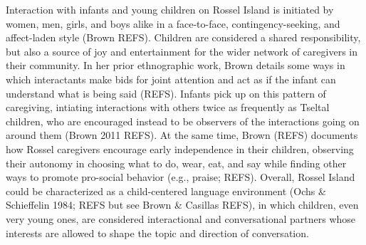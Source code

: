 \documentclass[,man,floatsintext]{apa6}
\begin{document}
Interaction with infants and young children on Rossel Island is
initiated by women, men, girls, and boys alike in a face-to-face,
contingency-seeking, and affect-laden style (Brown REFS). Children are
considered a shared responsibility, but also a source of joy and
entertainment for the wider network of caregivers in their community. In
her prior ethnographic work, Brown details some ways in which
interactants make bids for joint attention and act as if the infant can
understand what is being said (REFS). Infants pick up on this pattern of
caregiving, intiating interactions with others twice as frequently as
Tseltal children, who are encouraged instead to be observers of the
interactions going on around them (Brown 2011 REFS). At the same time,
Brown (REFS) documents how Rossel caregivers encourage early
independence in their children, observing their autonomy in choosing
what to do, wear, eat, and say while finding other ways to promote
pro-social behavior (e.g., praise; REFS). Overall, Rossel Island could
be characterized as a child-centered language environment (Ochs \&
Schieffelin 1984; REFS but see Brown \& Casillas REFS), in which
children, even very young ones, are considered interactional and
conversational partners whose interests are allowed to shape the topic
and direction of conversation.
\end{document}
